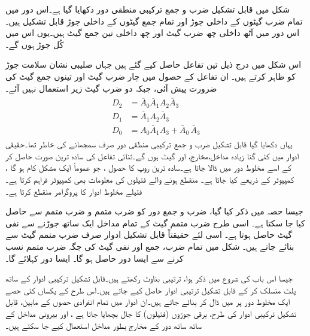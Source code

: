 شکل  میں قابل تشکیل ضرب و جمع ترکیبی منطقی دور دکھایا گیا ہے۔اس دور میں تمام ضرب گیٹوں کے داخلی جوڑ اور تمام جمع گیٹوں کے داخلی جوڑ قابل تشکیل ہیں۔اس دور میں آٹھ داخلی چھ ضرب گیٹ اور چھ داخلی تین جمع گیٹ ہیں۔یوں اس میں کُل جوڑ  ہوں گے۔

اس شکل میں درج ذیل تین تفاعل حاصل کیے گئے ہیں جہاں صلیبی نشان سلامت جوڑ کو ظاہر کرتے ہیں۔ ان تفاعل کے حصول میں چار ضرب گیٹ اور تینوں جمع گیٹ کی ضرورت پیش آئی، جبکہ دو ضرب گیٹ زیر استعمال نہیں آئے۔
\begin{gather}
\begin{aligned}\label{مساوات_قابل_تشکیل_ڈی_مساوات}
D_2&=\overline{A}_0\overline{A}_1 A_2 \overline{A}_3\\
D_1&=\overline{A}_1A_2 \overline{A}_3\\
D_0&=A_0\overline{A}_1A_3+\overline{A}_0\,\overline{A}_3
\end{aligned}
\end{gather}
 یہاں دکھایا گیا قابل تشکیل ضرب و جمع ترکیبی منطقی دور صرف سمجھانے کی خاطر تھا۔حقیقی ادوار میں کئی گنا زیادہ مداخل،مخارج، اور گیٹ ہوں گے۔ثنائی تفاعل کی سادہ ترین صورت حاصل کر کے اسے مخلوط دور میں ڈالا جاتا ہے۔سادہ ترین روپ کا حصول ، جو عموماً ایک مشکل کام ہو گا ، کمپیوٹر کے ذریعے کیا جاتا ہے۔ منقطع ہونے والے فتیلوں کی معلومات بھی کمپیوٹر فراہم کرتا ہے۔فتیلے مخلوط ادوار کا پروگرامر منقطع کرتا ہے۔
 
 جیسا حصہ  میں ذکر کیا گیا، ضرب و جمع دور کو ضرب متمم و ضرب متمم  سے حاصل کیا جا سکتا ہے۔ اسی طرح ضرب متمم گیٹ کے تمام مداخل ایک ساتھ جوڑنے سے نفی گیٹ حاصل ہوتا ہے۔ اسی لئے حقیقتاً قابل تشکیل ادوار صرف ضرب متمم گیٹ سے بنائے جاتے ہیں۔ شکل  میں تمام ضرب،   جمع  اور نفی گیٹ کی جگہ  ضرب متمم  نسب کرنے سے   ایسا دور حاصل ہو گا۔ ایسا دور  کہلائے گا۔


جیسا اس باب کی شروع میں ذکر ہوا،  ترتیبی بناوٹ رکھتے ہیں۔قابل تشکیل ترکیبی ادوار کے ساتھ پلٹ منسلک کر کے قابل تشکیل ترتیبی ادوار حاصل کیے جاتے ہیں۔اس طرح کے یکساں کئی حصے ایک مخلوط دور پر میں ڈال کر  بنائے جاتے ہیں۔ان ادوار میں تمام انفرادی حصوں کے مابین، قابل تشکیل ترکیبی ادوار کی طرح، برقی جوڑوں (فتیلوں) کا جال بچھایا جاتا ہے ، اور بیرونی مداخل کے ساتھ ساتھ دور کے مخارج بطور مداخل استعمال کیے جا سکتے ہیں۔

